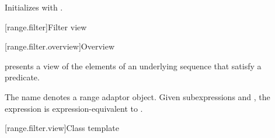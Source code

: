 \begin{itemdescr}
\pnum
\effects
Initializes  with .
\end{itemdescr}

[range.filter]{Filter view}

[range.filter.overview]{Overview}

\pnum
{} presents a view of the elements
of an underlying sequence that satisfy a predicate.

\pnum
{}%
The name  denotes a
range adaptor object.
Given subexpressions  and ,
the expression  is expression-equivalent to
.

\pnum
\begin{example}
\end{example}

[range.filter.view]{Class template }

